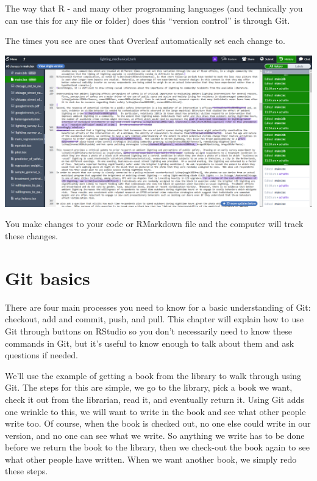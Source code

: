 \documentclass[
]{krantz}
\begin{document}
The way that R - and many other programming languages (and technically you can use this for any file or folder) does this ``version control'' is through Git.

The times you see are ones that Overleaf automatically set each change to.

\includegraphics{images/overleaf.png}

You make changes to your code or RMarkdown file and the computer will track these changes.

\hypertarget{git-basics}{%
\section{Git basics}\label{git-basics}}

There are four main processes you need to know for a basic understanding of Git: checkout, add and commit, push, and pull. This chapter will explain how to use Git through buttons on RStudio so you don't necessarily need to know these commands in Git, but it's useful to know enough to talk about them and ask questions if needed.

We'll use the example of getting a book from the library to walk through using Git. The steps for this are simple, we go to the library, pick a book we want, check it out from the librarian, read it, and eventually return it. Using Git adds one wrinkle to this, we will want to write in the book and see what other people write too. Of course, when the book is checked out, no one else could write in our version, and no one can see what we write. So anything we write has to be done before we return the book to the library, then we check-out the book again to see what other people have written. When we want another book, we simply redo these steps.
\end{document}
